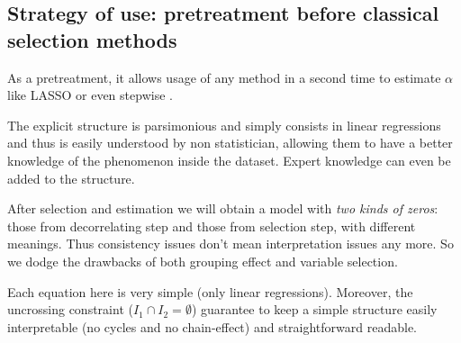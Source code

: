 \documentclass[11pt,a4paper]{article}
\begin{document}
\subsection{Strategy of use: pretreatment before classical selection methods}\label{interpretation}
As a pretreatment, it allows usage of any method in a second time to estimate $\alpha$like LASSO or even stepwise \cite{seber2012linear}.


The explicit structure is parsimonious and simply consists in linear regressions and thus is easily understood by non statistician, allowing them to have a better knowledge of the phenomenon inside the dataset. Expert knowledge can even be added to the structure.

After selection and estimation we will obtain a model with { \it two kinds of zeros}: those from decorrelating step and those from selection step, with different meanings. 
Thus consistency issues don't mean interpretation issues any more. So we dodge the drawbacks of both grouping effect and variable selection.

Each equation here is very simple (only linear regressions). 
Moreover, the uncrossing constraint ($I_1\cap I_2=\emptyset$) guarantee to keep a simple structure easily interpretable (no cycles and no chain-effect) and straightforward readable.
\end{document}
